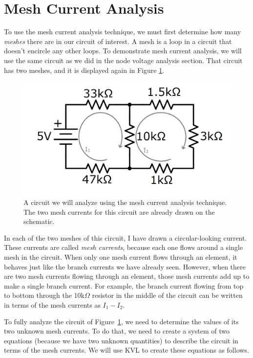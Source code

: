 \section{Mesh Current Analysis}
To use the mesh current analysis technique, we must first determine how many \textit{meshes} there are in our circuit of interest. A mesh is a loop in a circuit that doesn't encircle any other loops. To demonstrate mesh current analysis, we will use the same circuit as we did in the node voltage analysis section. That circuit has two meshes, and it is displayed again in Figure \ref{meshCurrentCircuit}.
\begin{figure}[h!]
\centering
\includegraphics[width=4.65in]{figures/meshCurrentExCircuit.png}
\caption{A circuit we will analyze using the mesh current analysis technique. The two mesh currents for this circuit are already drawn on the schematic.}
\label{meshCurrentCircuit}
\end{figure}
In each of the two meshes of this circuit, I have drawn a circular-looking current. These currents are called \textit{mesh currents}, because each one flows around a single mesh in the circuit. When only one mesh current flows through an element, it behaves just like the branch currents we have already seen. However, when there are two mesh currents flowing through an element, those mesh currents add up to make a single branch current. For example, the branch current flowing from top to bottom through the 10k$\Omega$ resistor in the middle of the circuit can be written in terms of the mesh currents as $I_1-I_2$.
\par
To fully analyze the circuit of Figure~\ref{meshCurrentCircuit}, we need to determine the values of its two unknown mesh currents. To do that, we need to create a system of two equations (because we have two unknown quantities) to describe the circuit in terms of the mesh currents. We will use KVL to create these equations as follows.
